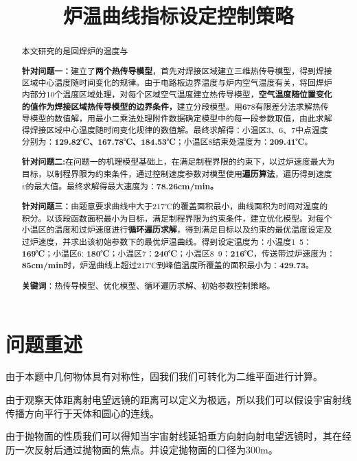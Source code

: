 \documentclass[withoutpreface,bwprint]{cumcmthesis} %
\title{炉温曲线指标设定控制策略}
\numberwithin{equation}{subsection}
\begin{document}
 \maketitle
 \begin{abstract}
本文研究的是回焊炉的温度与

\textbf{针对问题一：}建立了\textbf{两个热传导模型}，首先对焊接区域建立三维热传导模型，得到焊接区域中心温度随时间变化的规律。由于电路板边界温度与炉内空气温度有关，将回焊炉内部分10个温度区域处理，对每个区域空气温度建立热传导模型，\textbf{空气温度随位置变化的值作为焊接区域热传导模型的边界条件，}建立分段模型。用\textbf678{有限差分法}求解热传导模型的数值解，用最小二乘法处理附件数据确定模型中的每一段参数取值，由此求解得焊接区域中心温度随时间变化规律的数值解。最终求解得：小温区3、6、7中点温度分别为：\textbf{129.82℃、167.78℃、184.53℃}；小温区8结束处温度为：\textbf{209.41℃}。

\textbf{针对问题二:}在问题一的机理模型基础上，在满足制程界限的约束下，以过炉速度最大为目标，以制程界限为约束条件，通过控制速度参数对模型使用\textbf{遍历算法}，遍历得到速度$v$的最大值。最终求解得最大速度为：\textbf{78.26cm/min。}

\textbf{针对问题三：}由题意要求曲线中大于217℃的覆盖面积最小，曲线面积为时间对温度的积分。以该段函数面积最小为目标，满足制程界限为约束条件，建立优化模型。对每个小温区的温度和过炉速度进行\textbf{循环遍历求解}，得到满足目标以及约束的最优温度设定及过炉速度，并求出该初始参数下的最优炉温曲线。得到设定温度为：小温度1~5：\textbf{169℃}；小温区6: \textbf{180℃}；小温区7：\textbf{240℃}；小温区8~9：\textbf{216℃}，传送带过炉速度为：\textbf{85cm/min}时，炉温曲线上超过217℃到峰值温度所覆盖的面积最小为：\textbf{429.73}。


\textbf{关键词}：热传导模型、优化模型、循环遍历求解、初始参数控制策略。
\end{abstract}





\section{问题重述}

由于本题中几何物体具有对称性，固我们我们可转化为二维平面进行计算。

由于观察天体距离射电望远镜的距离可以定义为极远，所以我们可以假设宇宙射线传播方向平行于天体和圆心的连线。

由于抛物面的性质我们可以得知当宇宙射线延铅垂方向射向射电望远镜时，其在经历一次反射后通过抛物面的焦点。并设定抛物面的口径为300m。
\end{document}
